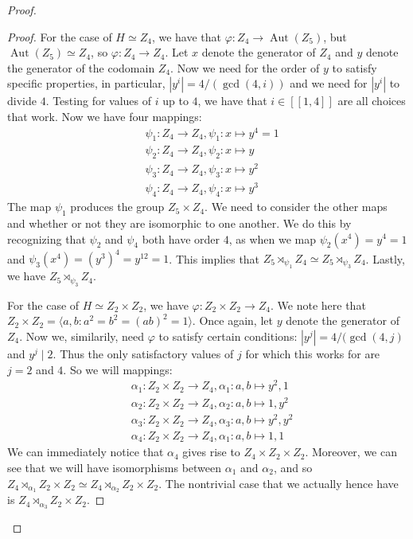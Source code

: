 \documentclass[9pt,reqno]{amsart}
\theoremstyle{definition}
\DeclareMathOperator{\aut}{Aut}
\begin{document}
\begin{proof}
\begin{proof}
	For the case of $H \simeq Z_4$, we have that $\varphi \colon Z_4 \to \aut (Z_5)$, but $\aut( Z_5) \simeq Z_4$, so $\varphi \colon Z_4 \to Z_4$. Let $x$ denote the generator of $Z_4$ and $y$ denote the generator of the codomain $Z_4$. Now we need for the order of $y$ to satisfy specific properties, in particular, $|y^i | = 4/ (\gcd (4, i))$ and we need for $|y^i|$ to divide $4$. Testing for values of $i$ up to $4$, we have that $i \in [[1, 4 ]]$ are all choices that work. Now we have four mappings:
	\begin{align*}
		& \psi_1 \colon Z_4 \to Z_4, \psi_1 \colon x \mapsto y^4 = 1 \\
		& \psi_2 \colon Z_4 \to Z_4, \psi_2 \colon x \mapsto y \\
		& \psi_3 \colon Z_4 \to Z_4, \psi_3 \colon x \mapsto y^2 \\ 
		& \psi_4 \colon Z_4 \to Z_4, \psi_4 \colon x \mapsto y^3 
	\end{align*} 
	The map $\psi_1$ produces the group $Z_5 \times Z_4$. We need to consider the other maps and whether or not they are isomorphic to one another. We do this by recognizing that $\psi_2 $ and $\psi_4$ both have order $4$, as when we map $\psi_2 (x^4) = y^4 = 1$ and $\psi_ 3 (x^4) = (y^3)^4 = y^{12} = 1$. This implies that $Z_5 \rtimes_{\psi_1} Z_4 \simeq Z_5 \rtimes_{\psi_3} Z_4$. Lastly, we have $Z_5 \rtimes_{\psi_3} Z_4$. 
	
	For the case of $H \simeq Z_2 \times Z_2$, we have $\varphi \colon Z_2 \times Z_2 \to Z_4$. We note here that $Z_2 \times Z_2 = \langle a, b \colon a^2 = b^2 = (ab)^2 = 1 \rangle$. Once again, let $y$ denote the generator of $Z_4$. Now we, similarily, need $\varphi$ to satisfy certain conditions: $|y^j| = 4/(\gcd (4, j)$ and $y^j \mid 2$. Thus the only satisfactory values of $j$ for which this works for are $j = 2$ and $4$. So we will mappings: 
	\begin{align*}
		& \alpha_1 \colon Z_2 \times Z_2 \to Z_4, \alpha_1 \colon a,b  \mapsto y^2, 1 \\
		& \alpha_2 \colon Z_2 \times Z_2 \to Z_4, \alpha_2 \colon a,b  \mapsto 1, y^2 \\
		& \alpha_3 \colon Z_2 \times Z_2 \to Z_4, \alpha_3 \colon a,b  \mapsto y^2, y^2 \\
		& \alpha_4 \colon Z_2 \times Z_2 \to Z_4, \alpha_1 \colon a,b  \mapsto 1, 1 
	\end{align*}
	We can immediately notice that $\alpha_4$ gives rise to $Z_4 \times Z_2 \times Z_2$. Moreover, we can see that we will have isomorphisms between $\alpha_1$ and $\alpha_2$, and so $Z_4 \rtimes_{\alpha_1} Z_2 \times Z_2 \simeq Z_4 \rtimes_{\alpha_2} Z_2 \times Z_2$. The nontrivial case that we actually hence have is $Z_4 \rtimes_{\alpha_3} Z_2 \times Z_2$.
\end{proof}


\end{proof}
\end{document}
